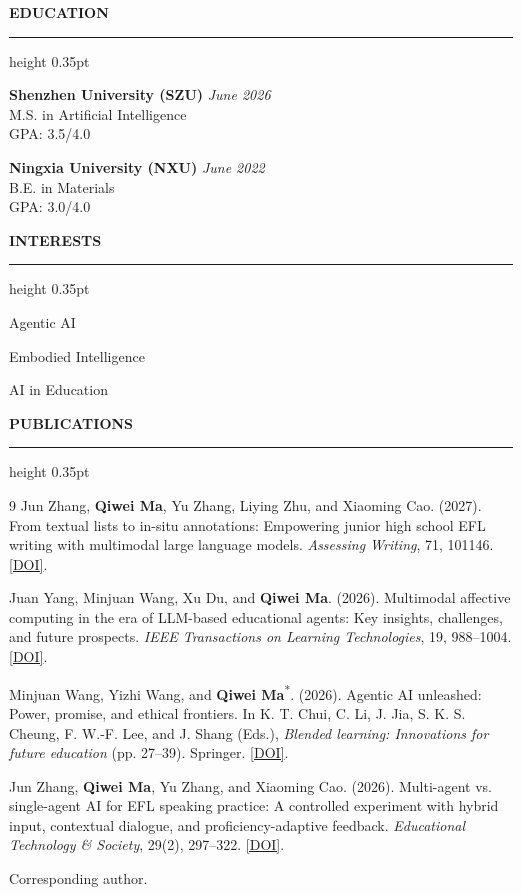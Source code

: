 \documentclass{resume} %
\renewenvironment{rSection}[1]{
  \sectionskip
  \textbf{\MakeUppercase{#1}}
  \sectionlineskip
  {\color[gray]{0.6}\hrule height 0.35pt}
  \begin{list}{}{
  \setlength{\leftmargin}{1.5em}
  \setlength{\topsep}{4pt}
  \setlength{\partopsep}{0pt}
  }
  \item[]\RaggedRight\hyphenpenalty=10000\relax
  }{
  \end{list}
  }
\begin{document}
  \begin{rSection}{Education}
  {\bf Shenzhen University (SZU)} \hfill {\em June 2026} \\
  M.S. in Artificial Intelligence \\
  GPA: 3.5/4.0

  {\bf Ningxia University (NXU)} \hfill {\em June 2022} \\
  B.E. in Materials \\
  GPA: 3.0/4.0
  \end{rSection}

  \begin{rSection}{Interests}
  \begin{rSubsection}{}{}{}{}
  \item Agentic AI
  \item Embodied Intelligence
  \item AI in Education
  \end{rSubsection}
  \end{rSection}

  \begin{rSection}{Publications}
  \itemsep -2pt

  \begingroup\fontsize{10.5}{12.8}\selectfont\RaggedRight{}\relax
  \renewcommand{\section}[2]{}
  \begin{thebibliography}{9}
  \setlength{\itemsep}{4pt}
  \setlength{\parskip}{0pt}
   Jun Zhang, \textbf{Qiwei Ma}, Yu Zhang, Liying Zhu, and Xiaoming Cao. (2027).
  From textual lists to in-situ annotations: Empowering junior high school EFL writing with multimodal
  large language models. \emph{Assessing Writing}, 71, 101146.
  \href{https://doi.org/10.1016/j.asw.2026.101146}{[DOI]}.

   Juan Yang, Minjuan Wang, Xu Du, and \textbf{Qiwei Ma}. (2026).
  Multimodal affective computing in the era of LLM-based educational agents: Key insights,
  challenges, and future prospects. \emph{IEEE Transactions on Learning Technologies}, 19, 988--1004.
  \href{https://doi.org/10.1109/TLT.2026.3738338}{[DOI]}.

   Minjuan Wang, Yizhi Wang, and \textbf{Qiwei Ma}\textsuperscript{*}. (2026).
  Agentic AI unleashed: Power, promise, and ethical frontiers. In K. T. Chui, C. Li, J. Jia,
  S. K. S. Cheung, F. W.-F. Lee, and J. Shang (Eds.),
  \emph{Blended learning: Innovations for future education} (pp. 27--39). Springer.
  \href{https://doi.org/10.1007/978-981-92-3761-6_3}{[DOI]}.

   Jun Zhang, \textbf{Qiwei Ma}, Yu Zhang, and Xiaoming Cao. (2026).
  Multi-agent vs. single-agent AI for EFL speaking practice: A controlled experiment with hybrid input,
  contextual dialogue, and proficiency-adaptive feedback. \emph{Educational Technology \& Society},
  29(2), 297--322. \href{https://doi.org/10.30191/ETS.202604_29(2).SP05}{[DOI]}.
  \end{thebibliography}
  \endgroup
  {\footnotesize * Corresponding author.}
  \end{rSection}
\end{document}
